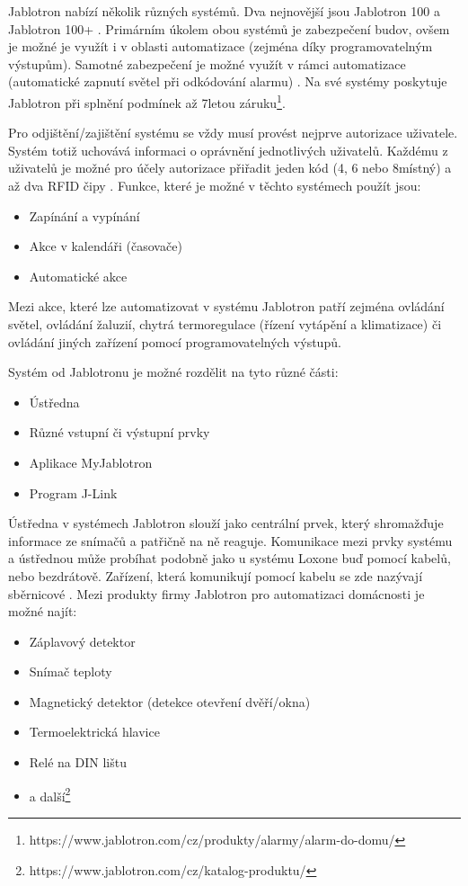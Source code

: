 Jablotron nabízí několik různých systémů. Dva nejnovější jsou Jablotron 100 a Jablotron 100+ \cite{OJablotronu}. Primárním úkolem obou systémů je zabezpečení budov, ovšem je možné je využít i v oblasti automatizace (zejména díky programovatelným výstupům). Samotné zabezpečení je možné využít v rámci automatizace (automatické zapnutí světel při odkódování alarmu) \cite{J100Manual}. Na své systémy poskytuje Jablotron při splnění podmínek až 7letou záruku\footnote{https://www.jablotron.com/cz/produkty/alarmy/alarm-do-domu/}.

Pro odjištění/zajištění systému se vždy musí provést nejprve autorizace uživatele. Systém totiž uchovává informaci o oprávnění jednotlivých uživatelů. Každému z uživatelů je možné pro účely autorizace přiřadit jeden kód (4, 6 nebo 8místný) a až dva RFID čipy \cite{J100Manual}. Funkce, které je možné v těchto systémech použít jsou:
 \begin{itemize}
     \item Zapínání a vypínání
     \item Akce v kalendáři (časovače)
     \item Automatické akce \cite{JLinkManual}
 \end{itemize}
Mezi akce, které lze automatizovat v systému Jablotron patří zejména ovládání světel, ovládání žaluzií, chytrá termoregulace (řízení vytápění a klimatizace) \cite{ChytraFirma} či ovládání jiných zařízení pomocí programovatelných výstupů. 

Systém od Jablotronu je možné rozdělit na tyto různé části:
\begin{itemize}
    \item Ústředna
    \item Různé vstupní či výstupní prvky
    \item Aplikace MyJablotron
    \item Program J-Link
\end{itemize}
Ústředna v systémech Jablotron slouží jako centrální prvek, který shromažďuje informace ze snímačů a patřičně na ně reaguje. Komunikace mezi prvky systému a ústřednou může probíhat podobně jako u systému Loxone buď pomocí kabelů, nebo bezdrátově. Zařízení, která komunikují pomocí kabelu se zde nazývají sběrnicové \cite{J100Manual}. Mezi produkty firmy Jablotron pro automatizaci domácnosti je možné najít:

\begin{itemize}
    \item Záplavový detektor
    \item Snímač teploty
    \item Magnetický detektor (detekce otevření dvěří/okna)
    \item Termoelektrická hlavice
    \item Relé na DIN lištu 
    \item a další\footnote{https://www.jablotron.com/cz/katalog-produktu/}
\end{itemize}


